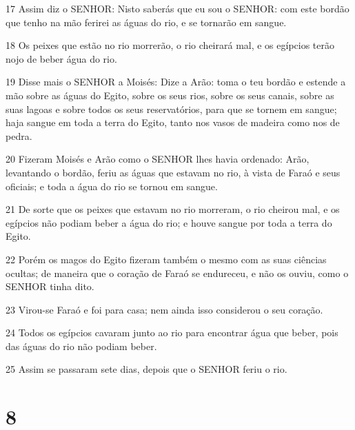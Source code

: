 \par 17 Assim diz o SENHOR: Nisto saberás que eu sou o SENHOR: com este bordão que tenho na mão ferirei as águas do rio, e se tornarão em sangue.
\par 18 Os peixes que estão no rio morrerão, o rio cheirará mal, e os egípcios terão nojo de beber água do rio.
\par 19 Disse mais o SENHOR a Moisés: Dize a Arão: toma o teu bordão e estende a mão sobre as águas do Egito, sobre os seus rios, sobre os seus canais, sobre as suas lagoas e sobre todos os seus reservatórios, para que se tornem em sangue; haja sangue em toda a terra do Egito, tanto nos vasos de madeira como nos de pedra.
\par 20 Fizeram Moisés e Arão como o SENHOR lhes havia ordenado: Arão, levantando o bordão, feriu as águas que estavam no rio, à vista de Faraó e seus oficiais; e toda a água do rio se tornou em sangue.
\par 21 De sorte que os peixes que estavam no rio morreram, o rio cheirou mal, e os egípcios não podiam beber a água do rio; e houve sangue por toda a terra do Egito.
\par 22 Porém os magos do Egito fizeram também o mesmo com as suas ciências ocultas; de maneira que o coração de Faraó se endureceu, e não os ouviu, como o SENHOR tinha dito.
\par 23 Virou-se Faraó e foi para casa; nem ainda isso considerou o seu coração.
\par 24 Todos os egípcios cavaram junto ao rio para encontrar água que beber, pois das águas do rio não podiam beber.
\par 25 Assim se passaram sete dias, depois que o SENHOR feriu o rio.

\chapter{8}

